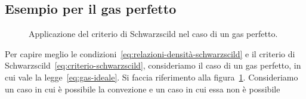 \subsection{Esempio per il gas perfetto}
\begin{figure}
\centering
{} \quad
{} 
\caption{Applicazione del criterio di Schwarzscild nel caso di un gas perfetto.}
\label{fig:criterio-schwarzscild-gas-perfetto}
\end{figure}

Per capire meglio le condizioni~\eqref{eq:relazioni-densità-schwarzscild} e il criterio di Schwarzscild~\eqref{eq:criterio-schwarzscild}, consideriamo il caso di un gas perfetto, in cui vale la legge~\eqref{eq:gas-ideale}. Si faccia riferimento alla figura~\ref{fig:criterio-schwarzscild-gas-perfetto}. Consideriamo un caso in cui è possibile la convezione e un caso in cui essa non è possibile

